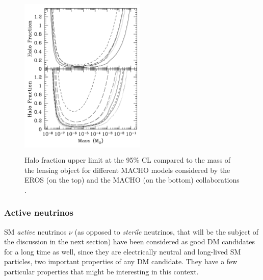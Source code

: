 \documentclass[a4paper, 10pt, openright]{report}
\begin{document}
\begin{figure}[htbp]
\begin{center}
\includegraphics[width=6cm, height=8cm]{figs/MACHOExclusion.png}
\caption{Halo fraction upper limit at the 95\% \ac{CL} compared to the mass of the lensing object for different \ac{MACHO} models considered by the EROS (on the top) and the MACHO (on the bottom) collaborations \cite{ExclusionMACHO}.}
\label{figure:ExclusionMACHO}
\end{center}
\end{figure}

\subsubsection*{Active neutrinos}
\ac{SM} \textit{active} neutrinos $\nu$ (as opposed to \textit{sterile} neutrinos, that will be the subject of the discussion in the next section) have been considered as good \ac{DM} candidates for a long time as well, since they are electrically neutral and long-lived \ac{SM} particles, two important properties of any \ac{DM} candidate. They have a few particular properties that might be interesting in this context.
\end{document}
